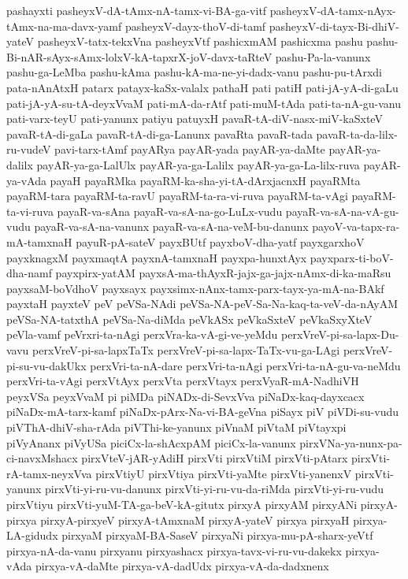 {pashayxti
pasheyxV-dA-tAmx-nA-tamx-vi-BA-ga-vitf
pasheyxV-dA-tamx-nAyx-tAmx-na-ma-davx-yamf
pasheyxV-dayx-thoV-di-tamf
pasheyxV-di-tayx-Bi-dhiV-yateV
pasheyxV-tatx-tekxVna
pasheyxVtf
pashicxmAM
pashicxma
pashu
pashu-Bi-nAR-sAyx-sAmx-lolxV-kA-tapxrX-joV-davx-taRteV
pashu-Pa-la-vanunx
pashu-ga-LeMba
pashu-kAma
pashu-kA-ma-ne-yi-dadx-vanu
pashu-pu-tArxdi
pata-nAnAtxH
patarx
patayx-kaSx-valalx
pathaH
pati
patiH
pati-jA-yA-di-gaLu
pati-jA-yA-su-tA-deyxVvaM
pati-mA-da-rAtf
pati-muM-tAda
pati-ta-nA-gu-vanu
pati-varx-teyU
pati-yanunx
patiyu
patuyxH
pavaR-tA-diV-nasx-miV-kaSxteV
pavaR-tA-di-gaLa
pavaR-tA-di-ga-Lanunx
pavaRta
pavaR-tada
pavaR-ta-da-lilx-ru-vudeV
pavi-tarx-tAmf
payARya
payAR-yada
payAR-ya-daMte
payAR-ya-dalilx
payAR-ya-ga-LalUlx
payAR-ya-ga-Lalilx
payAR-ya-ga-La-lilx-ruva
payAR-ya-vAda
payaH
payaRMka
payaRM-ka-sha-yi-tA-dArxjacnxH
payaRMta
payaRM-tara
payaRM-ta-ravU
payaRM-ta-ra-vi-ruva
payaRM-ta-vAgi
payaRM-ta-vi-ruva
payaR-va-sAna
payaR-va-sA-na-go-LuLx-vudu
payaR-va-sA-na-vA-gu-vudu
payaR-va-sA-na-vanunx
payaR-va-sA-na-veM-bu-danunx
payoV-va-tapx-ra-mA-tamxnaH
payuR-pA-sateV
payxBUtf
payxboV-dha-yatf
payxgarxhoV
payxknagxM
payxmaqtA
payxnA-tamxnaH
payxpa-hunxtAyx
payxparx-ti-boV-dha-namf
payxpirx-yatAM
payxsA-ma-thAyxR-jajx-ga-jajx-nAmx-di-ka-maRsu
payxsaM-boVdhoV
payxsayx
payxsimx-nAnx-tamx-parx-tayx-ya-mA-na-BAkf
payxtaH
payxteV
peV
peVSa-NAdi
peVSa-NA-peV-Sa-Na-kaq-ta-veV-da-nAyAM
peVSa-NA-tatxthA
peVSa-Na-diMda
peVkASx
peVkaSxteV
peVkaSxyXteV
peVla-vamf
peVrxri-ta-nAgi
perxVra-ka-vA-gi-ve-yeMdu
perxVreV-pi-sa-lapx-Du-vavu
perxVreV-pi-sa-lapxTaTx
perxVreV-pi-sa-lapx-TaTx-vu-ga-LAgi
perxVreV-pi-su-vu-dakUkx
perxVri-ta-nA-dare
perxVri-ta-nAgi
perxVri-ta-nA-gu-va-neMdu
perxVri-ta-vAgi
perxVtAyx
perxVta
perxVtayx
perxVyaR-mA-NadhiVH
peyxVSa
peyxVvaM
pi
piMDa
piNADx-di-SevxVva
piNaDx-kaq-dayxcacx
piNaDx-mA-tarx-kamf
piNaDx-pArx-Na-vi-BA-geVna
piSayx
piV
piVDi-su-vudu
piVThA-dhiV-sha-rAda
piVThi-ke-yanunx
piVnaM
piVtaM
piVtayxpi
piVyAnanx
piVyUSa
piciCx-la-shAcxpAM
piciCx-la-vanunx
pirxVNa-ya-nunx-pa-ci-navxMshacx
pirxVteV-jAR-yAdiH
pirxVti
pirxVtiM
pirxVti-pAtarx
pirxVti-rA-tamx-neyxVva
pirxVtiyU
pirxVtiya
pirxVti-yaMte
pirxVti-yanenxV
pirxVti-yanunx
pirxVti-yi-ru-vu-danunx
pirxVti-yi-ru-vu-da-riMda
pirxVti-yi-ru-vudu
pirxVtiyu
pirxVti-yuM-TA-ga-beV-kA-gitutx
pirxyA
pirxyAM
pirxyANi
pirxyA-pirxya
pirxyA-pirxyeV
pirxyA-tAmxnaM
pirxyA-yateV
pirxya
pirxyaH
pirxya-LA-gidudx
pirxyaM
pirxyaM-BA-SaseV
pirxyaNi
pirxya-mu-pA-sharx-yeVtf
pirxya-nA-da-vanu
pirxyanu
pirxyashacx
pirxya-tavx-vi-ru-vu-dakekx
pirxya-vAda
pirxya-vA-daMte
pirxya-vA-dadUdx
pirxya-vA-da-dadxnenx
}
